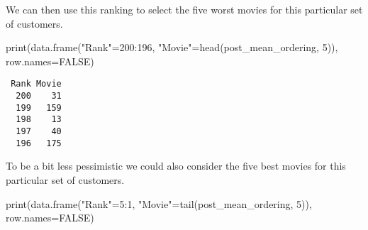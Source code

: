 \documentclass[
  letterpaper,
  DIV=11,
  numbers=noendperiod]{scrartcl}
\newenvironment{Shaded}{\begin{snugshade}}{\end{snugshade}}
\newcommand{\AttributeTok}[1]{\textcolor[rgb]{0.40,0.45,0.13}{#1}}
\newcommand{\ConstantTok}[1]{\textcolor[rgb]{0.56,0.35,0.01}{#1}}
\newcommand{\ControlFlowTok}[1]{\textcolor[rgb]{0.00,0.23,0.31}{#1}}
\newcommand{\DecValTok}[1]{\textcolor[rgb]{0.68,0.00,0.00}{#1}}
\newcommand{\FunctionTok}[1]{\textcolor[rgb]{0.28,0.35,0.67}{#1}}
\newcommand{\NormalTok}[1]{\textcolor[rgb]{0.00,0.23,0.31}{#1}}
\newcommand{\OtherTok}[1]{\textcolor[rgb]{0.00,0.23,0.31}{#1}}
\newcommand{\SpecialCharTok}[1]{\textcolor[rgb]{0.37,0.37,0.37}{#1}}
\newcommand{\StringTok}[1]{\textcolor[rgb]{0.13,0.47,0.30}{#1}}
\begin{document}
\begin{Shaded}
\end{Shaded}

We can then use this ranking to select the five worst movies for this
particular set of customers.

\begin{Shaded}
\begin{Highlighting}[]
\FunctionTok{print}\NormalTok{(}\FunctionTok{data.frame}\NormalTok{(}\StringTok{"Rank"}\OtherTok{=}\DecValTok{200}\SpecialCharTok{:}\DecValTok{196}\NormalTok{,}
                 \StringTok{"Movie"}\OtherTok{=}\FunctionTok{head}\NormalTok{(post\_mean\_ordering, }\DecValTok{5}\NormalTok{)),}
      \AttributeTok{row.names=}\ConstantTok{FALSE}\NormalTok{)}
\end{Highlighting}
\end{Shaded}

\begin{verbatim}
 Rank Movie
  200    31
  199   159
  198    13
  197    40
  196   175
\end{verbatim}

To be a bit less pessimistic we could also consider the five best movies
for this particular set of customers.

\begin{Shaded}
\begin{Highlighting}[]
\FunctionTok{print}\NormalTok{(}\FunctionTok{data.frame}\NormalTok{(}\StringTok{"Rank"}\OtherTok{=}\DecValTok{5}\SpecialCharTok{:}\DecValTok{1}\NormalTok{,}
                 \StringTok{"Movie"}\OtherTok{=}\FunctionTok{tail}\NormalTok{(post\_mean\_ordering, }\DecValTok{5}\NormalTok{)),}
      \AttributeTok{row.names=}\ConstantTok{FALSE}\NormalTok{)}
\end{Highlighting}
\end{Shaded}
\end{document}
